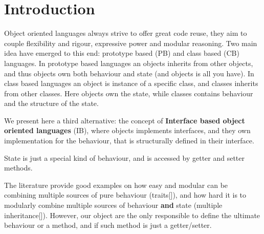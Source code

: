 \section{Introduction}\label{sec:intro}


Object oriented languages always strive to offer great code reuse,
they aim to couple flexibility and rigour, expressive power and modular reasoning.
Two main idea have emerged to this end: prototype based (PB) and class based (CB) languages.
In prototype based languages an objects inherits from other objects,
and thus objects own both behaviour and state (and objects is all you have).
In class based languages an object is instance of a specific class, and classes inherits from other classes.
Here objects own the state, while classes contains behaviour and the structure of the state.

We present here a third alternative: the concept of
 \textbf{Interface based object oriented languages} (IB), where 
  objects implements interfaces, and they own implementation for the behaviour,
that is structurally defined in their interface.
  
  State is just a special kind of behaviour, and is accessed by getter and setter methods.
  
  The literature provide good examples on how easy and modular can be combining
  multiple sources of pure behaviour (traits[]), and how
  hard it is to modularly combine multiple sources of behaviour \textbf{and} state (multiple inheritance[]).
  However, our object are the only responsible to define 
  the ultimate behaviour or a method, and if such method is just a getter/setter.

